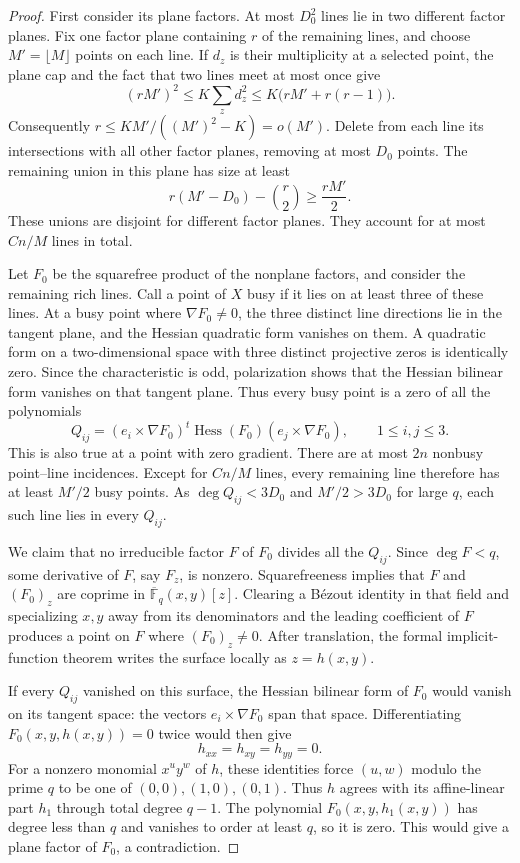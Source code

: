 \begin{proof}
First consider its plane factors.  At most $D_0^2$ lines lie in two
different factor planes.  Fix one factor plane containing $r$ of the
remaining lines, and choose $M'=\lfloor M\rfloor$ points on each line.
If $d_z$ is their multiplicity at a selected point, the plane cap and the
fact that two lines meet at most once give
\[
 (rM')^2\le K\sum_z d_z^2
 \le K\bigl(rM'+r(r-1)\bigr).
\]
Consequently $r\le KM'/((M')^2-K)=o(M')$.  Delete from each line its
intersections with all other factor planes, removing at most $D_0$ points.
The remaining union in this plane has size at least
\[
 r(M'-D_0)-\binom r2\ge \frac{rM'}2.
\]
These unions are disjoint for different factor planes.  They account for
at most $Cn/M$ lines in total.

Let $F_0$ be the squarefree product of the nonplane factors, and consider
the remaining rich lines.  Call a point of $X$ busy if it lies on at least
three of these lines.  At a busy point where $\nabla F_0\ne0$, the three
distinct line directions lie in the tangent plane, and the Hessian
quadratic form vanishes on them.  A quadratic form on a two-dimensional
space with three distinct projective zeros is identically zero.  Since
the characteristic is odd, polarization shows that the Hessian bilinear
form vanishes on that tangent plane.  Thus every busy point is a zero of
all the polynomials
\begin{equation}\label{eq:hessian-polynomials}
 Q_{ij}=(e_i\mathbin\times\nabla F_0)^t
              \operatorname{Hess}(F_0)
              (e_j\mathbin\times\nabla F_0),\qquad 1\le i,j\le3.
\end{equation}
This is also true at a point with zero gradient.  There are at most $2n$
nonbusy point--line incidences.  Except for $Cn/M$ lines, every remaining
line therefore has at least $M'/2$ busy points.  As $\deg Q_{ij}<3D_0$ and
$M'/2>3D_0$ for large $q$, each such line lies in every $Q_{ij}$.

We claim that no irreducible factor $F$ of $F_0$ divides all the
$Q_{ij}$.  Since $\deg F<q$, some derivative of $F$, say $F_z$, is
nonzero.  Squarefreeness implies that $F$ and $(F_0)_z$ are coprime in
$\overline{\mathbb F}_q(x,y)[z]$.  Clearing a B\'ezout identity in that
field and specializing $x,y$ away from its denominators and the leading
coefficient of $F$ produces a point on $F$ where $(F_0)_z\ne0$.
After translation, the formal implicit-function theorem writes the
surface locally as $z=h(x,y)$.

If every $Q_{ij}$ vanished on this surface, the Hessian bilinear form of
$F_0$ would vanish on its tangent space: the vectors
$e_i\mathbin\times\nabla F_0$ span that space.  Differentiating
$F_0(x,y,h(x,y))=0$ twice would then give
\[
 h_{xx}=h_{xy}=h_{yy}=0.
\]
For a nonzero monomial $x^u y^w$ of $h$, these identities force
$(u,w)$ modulo the prime $q$ to be one of
$(0,0),(1,0),(0,1)$.  Thus $h$ agrees with its affine-linear part $h_1$
through total degree $q-1$.  The polynomial $F_0(x,y,h_1(x,y))$ has degree
less than $q$ and vanishes to order at least $q$, so it is zero.  This
would give a plane factor of $F_0$, a contradiction.


\end{proof}
